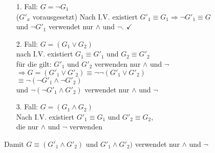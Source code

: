 \documentclass[a4paper]{scrartcl}
\begin{document}
\begin{enumerate}
\item[1. Fall:] $G = \neg G_1$\\
($G'_x$ vorausgesetzt) Nach I.V. existiert $G'_1 \equiv G_1 \Rightarrow \neg G'_1 \equiv G$\\
und $\neg G'_1$ verwendet nur $\wedge$ und $\neg$. $\checkmark$

\item[2. Fall:] $G = (G_1 \vee G_2)$\\
nach I.V. existiert $G_1 \equiv G'_1$ und $G_2 \equiv G'_2$\\
für die gilt: $G'_1$ und $G'_2$ verwenden nur $\wedge$ und $\neg$\\
$\Rightarrow G = (G'_1 \vee G'_2) \equiv \neg \neg (G'_1 \vee G'_2)$\\
$\equiv \neg ( \neg G'_1 \wedge \neg G'_2)$\\
und $\neg ( \neg G'_1 \wedge G'_2)$ verwendet nur $\wedge$ und $\neg$

\item[3. Fall:] $G = (G_1 \wedge G_2)$\\
Nach I.V. existiert $G'_1 \equiv G_1$ und $G'_2 \equiv G_2$,\\
die nur $\wedge$ und $\neg$ verwenden
\end{enumerate}

Damit $G \equiv (G'_1 \wedge G'_2)$ und $G'_1 \wedge G'_2)$ verwendet nur $\wedge$ und $\neg$
\end{document}
